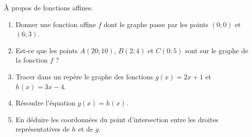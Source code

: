 
\begin{exercice}[\ldots/5]\label{exosmath-0671}

    À propos de fonctions affines.
    \begin{enumerate}
        \item
            Donner une fonction affine \( f\) dont le graphe passe par les points \( (0;0)\) et \( (6;3)\).
        \item
            Est-ce que les points \( A(20;10)\), \( B(2;4)\) et \( C(0;5)\) sont sur le graphe de la fonction \( f\) ?
        \item
            Tracer dans un repère le graphe des fonctions \( g(x)=2x+1\) et \( h(x)=3x-4\).
        \item
            Résoudre l'équation \( g(x)=h(x)\).
        \item
            En déduire les coordonnées du point d'intersection entre les droites représentatives de \( h\) et de \( g\).
    \end{enumerate}

\end{exercice}

